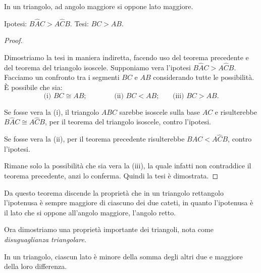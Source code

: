 \newpage %

\begin{teorema}
  In un triangolo, ad angolo maggiore si oppone lato maggiore.
\end{teorema}

  \noindent Ipotesi: \(B\widehat{A}C>A\widehat{C}B\). Tesi: \(BC>AB\).

\noindent\begin{proof}
~

\noindent\begin{minipage}{0.7\textwidth}\parindent15pt
    \noindent Dimostriamo la tesi in maniera indiretta, facendo uso del 
    teorema precedente e del teorema del triangolo isoscele. Supponiamo 
    vera l'ipotesi \(B\widehat{A}C>A\widehat{C}B\). Facciamo un confronto 
    tra i segmenti \(BC\) e \(AB\) considerando tutte le possibilità. \`E 
    possibile che sia:
    \[\text{(i) }BC\cong AB\text{;}\qquad\qquad \text{(ii) 
    }BC<AB\text{;}\quad\quad\text{(iii) }BC>AB\text{.}\]
\end{minipage}\hfil
\begin{minipage}{0.3\textwidth}
  \centering
\end{minipage}
    Se fosse vera la (i), il triangolo \(ABC\) sarebbe isoscele sulla base 
    \(AC\) e risulterebbe \(B\widehat{A}C\cong A\widehat{C}B\), per il 
    teorema del triangolo isoscele, contro l'ipotesi.
    
    Se fosse vera la (ii), per il teorema precedente risulterebbe 
    \(B\widehat{A}C<A\widehat{C}B\), contro l'ipotesi.
    
    Rimane solo la possibilità che sia vera la (iii), la quale infatti 
    non contraddice il teorema precedente, anzi lo conferma. Quindi la 
    tesi è dimostrata.
\end{proof}


Da questo teorema discende la proprietà che in un triangolo 
rettangolo l'ipotenusa è sempre maggiore di ciascuno dei due cateti, 
in quanto l'ipotenusa è il lato che si oppone all'angolo maggiore, 
l'angolo retto.

Ora dimostriamo una proprietà importante dei triangoli, nota come 
\emph{disuguaglianza triangolare}.

\begin{teorema}
  In un triangolo, ciascun lato è minore della somma degli altri due e 
  maggiore della loro differenza.
\end{teorema}

